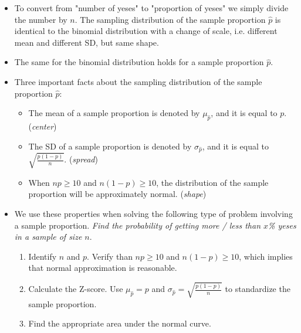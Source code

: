 \begin{itemize}
\item To convert from "number of yeses" to "proportion of yeses" we simply divide the number by $n$.  The sampling distribution of the sample proportion $\hat{p}$ is identical to the binomial distribution with a change of scale, i.e. different mean and different SD, but same shape.

\item The same  for the binomial distribution holds for a sample proportion $\hat{p}$.

\item Three important facts about the sampling distribution of the sample proportion $\hat{p}$:
\begin{itemize}\vspace{-1mm}
\item The mean of a sample proportion is denoted by $\mu_{\hat{p}}$, and it is equal to $p$.  (\textit{center})
\item The SD of a sample proportion is denoted by $\sigma_{\hat{p}}$, and it is equal to $\sqrt{\frac{p(1-p)}{n}}$.  (\textit{spread})
\item When $np\ge 10$ and $n(1-p)\ge 10$, the distribution of the sample proportion will be approximately normal.   (\textit{shape})
\end{itemize}

\item We use these properties when solving the following type of  problem involving a sample proportion.  
\emph{Find the probability of getting more / less than $x$\% yeses in a sample of size $n$}.
\begin{enumerate}\vspace{-1mm}
\setlength{\itemsep}{0mm}
\item Identify $n$ and $p$. Verify than $np\ge 10$ and $n(1-p)\ge 10$, which implies that normal approximation is reasonable. 
\item Calculate the Z-score.  Use $\mu_{\hat{p}} = p$ and $\sigma_{\hat{p}} = \sqrt{\frac{p(1-p)}{n}}$ to standardize the sample proportion.  
\item Find the appropriate area under the normal curve.  \end{enumerate}

\end{itemize}

{}



